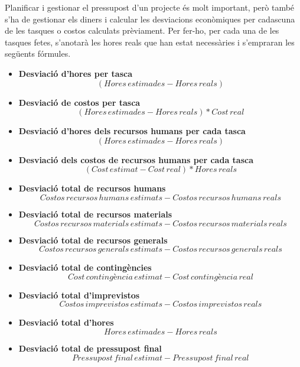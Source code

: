 \documentclass[a4paper]{article}
\begin{document}
Planificar i gestionar el pressupost d'un projecte és molt important, però també s'ha de gestionar els diners i calcular les desviacions econòmiques per cadascuna de les tasques o costos calculats prèviament. Per fer-ho, per cada una de les tasques fetes, s'anotarà les hores reals que han estat necessàries i s'empraran les següents fórmules.
\begin{itemize}
    \item \textbf{Desviació d'hores per tasca}
    \[(Hores\,estimades - Hores\,reals)\]
    \item \textbf{Desviació de costos per tasca}
    \[(Hores\,estimades - Hores\,reals) * Cost\,real\]
    \item \textbf{Desviació d'hores dels recursos humans per cada tasca}
    \[(Hores\,estimades - Hores\,reals)\]
    \item \textbf{Desviació dels costos de recursos humans per cada tasca}
    \[(Cost\, estimat - Cost\,real) * Hores\,reals\]
    \item \textbf{Desviació total de recursos humans}
    \[Costos\,recursos\,humans\,estimats - Costos\,recursos\,humans\,reals\]
    \item \textbf{Desviació total de recursos materials}
    \[Costos\,recursos\,materials\,estimats - Costos\,recursos\,materials\,reals\]
    \item \textbf{Desviació total de recursos generals}
    \[Costos\,recursos\,generals\,estimats - Costos\,recursos\,generals\,reals\]
    \item \textbf{Desviació total de contingències}
    \[Cost\,contingència\,estimat - Cost\,contingència\,real\]
    \item \textbf{Desviació total d'imprevistos}
    \[Costos\,imprevistos\,estimats - Costos\,imprevistos\,reals\]
    \item \textbf{Desviació total d'hores}
    \[Hores\,estimades - Hores\,reals\]
    \item \textbf{Desviació total de pressupost final}
    \[Pressupost\,final\,estimat - Pressupost\,final\,real\]
\end{itemize}

\newpage
\nocite{*}
\printbibliography[heading=bibintoc]
\end{document}
